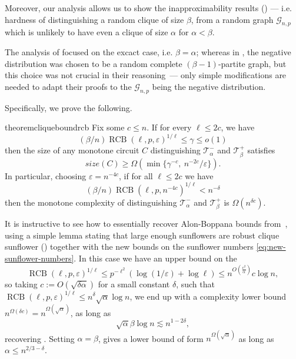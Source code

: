 \documentclass[10pt,a4paper]{article}
\newcommand{\RCB}{\mathop{RCB}}
\newcommand{\jnote}[1]{\todo[inline,backgroundcolor=blue!20!green]{#1 \\ \textsc{--Jarek}}}
\begin{document}
Moreover, our analysis allows us to show the inapproximability results () --- i.e. hardness of distinguishing a random clique of size $\beta$, from a random graph $\mathcal{G}_{n,p}$ which is unlikely to have even a clique of size $\alpha$ for $\alpha < \beta$. 

The analysis of \cite{razborov1985lower,cavalar2022} focused on the excact case, i.e. $\beta = \alpha$; whereas in \cite{razborov1985lower,alon87}, the negative distribution was chosen to be a random complete $(\beta-1)$-partite graph, but this choice was not crucial in their reasoning~--- only simple modifications are needed to adapt their proofs to the $\mathcal{G}_{n,p}$ being the negative distribution.

Specifically, we prove the following.
\begin{restatable}{theorem}{cliqueboundrcb}
\label{thm:clique-bound-rcb}
    Fix some $c \leq n$.  If for every $\ell \leq 2c$, we have
    $$(\beta / n) \RCB(\ell, p, \varepsilon)^{1/\ell} \leq \gamma \leq o(1)$$
    then the size of any monotone circuit $C$ distinguishing $\mathcal{T}^-_\alpha$ and $\mathcal{T}^+_\beta$ satisfies
    $$size(C) \geq \Omega(\min\{\gamma^{-c}, \ n^{-2c}/\varepsilon \}).$$
    In particular, choosing $\varepsilon = n^{-4c}$, if for all $\ell \leq 2 c$ we have
    \begin{equation*}
        (\beta / n) \RCB(\ell, p, n^{-4 c})^{1/\ell} < n^{-\delta}
    \end{equation*}
    then the monotone complexity of distinguishing $\mathcal{T}^-_\alpha$ and $\mathcal{T}^+_\beta$ is  $\Omega(n^{\delta c})$.
\end{restatable}

It is instructive to see how to essentially recover Alon-Boppana bounds from~, using a simple lemma stating that large enough sunflowers are robust clique sunflower () together with the new bounds on the sunflower numbers \eqref{eq:new-sunflower-numbers}. In this case we have an upper bound on the \begin{equation*}
\RCB(\ell, p, \varepsilon)^{1/\ell} \leq p^{-\ell^2} (\log(1/\varepsilon) + \log \ell) \leq n^{O(\frac{c^2}{\alpha})} c \log n,
\end{equation*}
so taking $c := O(\sqrt{\delta \alpha})$ for a small constant $\delta$, such that $\RCB(\ell, p, \varepsilon)^{1/\ell} \leq n^{\delta} \sqrt{\alpha} \log n$, we end up with a complexity lower bound $n^{\Omega(\delta c)} = n^{\Omega(\sqrt{\alpha})}$, as long as
\begin{equation*}
    \sqrt{\alpha} \beta \log n \lesssim n^{1 - 2\delta},
\end{equation*}
recovering \cite[Theorem 3.11]{alon87}. Setting $\alpha = \beta$, gives a lower bound of form $n^{\Omega(\sqrt{\alpha})}$ as long as $\alpha \leq n^{2/3 - \delta}$.
\end{document}
